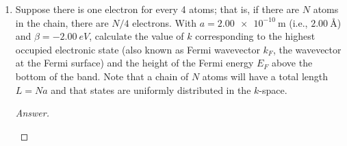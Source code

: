 \documentclass[../psets.tex]{subfiles}
\begin{document}
\begin{enumerate}[label={\Roman*)}]
\begin{enumerate}[label={\alph*.}]
\begin{proof}[Answer]
\begin{center}
            \end{center}
        \end{proof}
        \item Suppose there is one electron for every 4 atoms; that is, if there are $N$ atoms in the chain, there are $N/4$ electrons. With $a=\SI{2.00e-10}{\meter}$ (i.e., $\SI{2.00}{\angstrom}$) and $\beta=\SI{-2.00}{eV}$, calculate the value of $k$ corresponding to the highest occupied electronic state (also known as Fermi wavevector $k_F$, the wavevector at the Fermi surface) and the height of the Fermi energy $E_F$ above the bottom of the band. Note that a chain of $N$ atoms will have a total length $L=Na$ and that states are uniformly distributed in the $k$-space.
        \begin{proof}[Answer]
            \begin{figure}[H]
                \centering
                \begin{subfigure}[b]{0.7\linewidth}
                    \centering
\end{subfigure}
\end{figure}
\end{proof}
\end{enumerate}
\end{enumerate}
\end{document}
